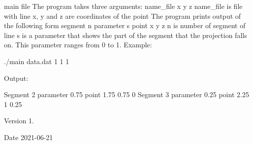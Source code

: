 main file The program takes three arguments\+: name\+\_\+file x y z name\+\_\+file is file with line x, y and z are coordinates of the point The program prints output of the following form segment n parameter s point x y z n is number of segment of line s is a parameter that shows the part of the segment that the projection falls on. This parameter ranges from 0 to 1. Example\+: \begin{DoxyVerb}./main data.dat 1 1 1 
\end{DoxyVerb}
 Output\+: \begin{DoxyVerb}Segment 2 parameter 0.75 point 1.75 0.75 0
Segment 3 parameter 0.25 point 2.25 1 0.25
\end{DoxyVerb}
\begin{DoxyVersion}{Version}
1. 
\end{DoxyVersion}
\begin{DoxyDate}{Date}
2021-\/06-\/21 
\end{DoxyDate}
